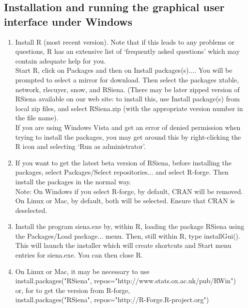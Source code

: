 \documentclass[a4paper,fleqn]{article}
\newcommand{\+}{\, + \,}
\newcommand{\sfn}[1]{\textsf{#1}}
\newcommand{\R}{{\sf R }}
\newcommand{\Rn}{{\sf R}}
\newcommand{\rs}{{\sf RSiena}}
\newcommand{\RS}{{\sf RSiena }}
\begin{document}
\subsection{Installation and running the graphical user interface under Windows}
\label{Gui}
\begin{enumerate}
\item %
  Install \R (most recent version). Note that if this leads to any
  problems or questions, \R has an extensive list of `frequently asked
  questions' which may contain adequate help for you.\\
  Start \Rn, click on \sfn{Packages} and
  then on \sfn{Install packages(s)...}. You will be prompted to select a mirror
  for download. Then select the packages \sfn{xtable},
  \sfn{network}, \sfn{rlecuyer}, \sfn{snow},
  and \rs. (There may be later zipped version of \RS available on our web
  site: to install this, use \sfn{Install package(s) from local zip files}, and
  select \sfn{RSiena.zip} (with the appropriate version number in the file
  name).\\
  If you are using Windows Vista and get an error of denied permission
  when trying to install the packages,
  you may get around this by right-clicking the \R icon and selecting
  `Run as administrator'.
\item If you want to get the latest beta version of \rs, before installing the
  packages, select \sfn{Packages/Select repositories...} and select
  \sfn{R-forge}. Then install the packages in the normal way. \\
  Note: On Windows if
  you select \sfn{R-forge}, by default, \sfn{CRAN} will be removed. On Linux or
  Mac, by default, both will be selected. Ensure that \sfn{CRAN} is deselected.
\item Install the program \sfn{siena.exe} by, within \Rn, loading the package
  RSiena using the \sfn{Packages/Load package...} menu. Then, still within \Rn,
  type \sfn{installGui()}. This will launch the installer which will create
  shortcuts and Start menu entries for \sfn{siena.exe}. You can then close \Rn.
\item On Linux or Mac, it may be necessary to use \\
 \sfn{install.packages("RSiena", repos="http://www.stats.ox.ac.uk/pub/RWin")}\\
or, for to get the version from \sfn{R-forge}, \\
 \sfn{install.packages("RSiena", repos="http://R-Forge.R-project.org")}



\end{enumerate}
\end{document}
